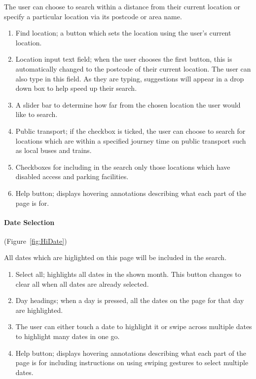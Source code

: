 The user can choose to search within a distance from their current
location or specify a particular location via its postcode or area
name.
\begin{enumerate}
	\item Find location; a button which sets the location using the user's
		current location.
	\item Location input text field; when the user chooses the first button,
		this is automatically changed to the postcode of their current
		location.  The user can also type in this field. As they are typing,
		suggestions will appear in a drop down box to help speed up their
		search.
	\item A slider bar to determine how far from the chosen location the user
		would like to search.
	\item Public transport; if the checkbox is ticked, the user can choose
		to search for locations which are within a specified journey time
		on public transport such as local buses and trains.
	\item Checkboxes for including in the search only those locations which
		have disabled access and parking facilities.
	\item Help button; displays hovering annotations describing what each part
		of the page is for.
\end{enumerate}

\paragraph{Date Selection} (Figure~\ref{fig:HiDate})


All dates which are higlighted on this page will be included in the
search.
\begin{enumerate}
	\item Select all; highlights all dates in the shown month. This button
		changes to clear all when all dates are already selected.
	\item Day headings; when a day is pressed, all the dates on the page for
		that day are highlighted.
	\item The user can either touch a date to highlight it or swipe across multiple
		dates to highlight many dates in one go.
	\item Help button; displays hovering annotations describing what each part
		of the page is for including instructions on using swiping gestures
		to select multiple dates.
\end{enumerate}

